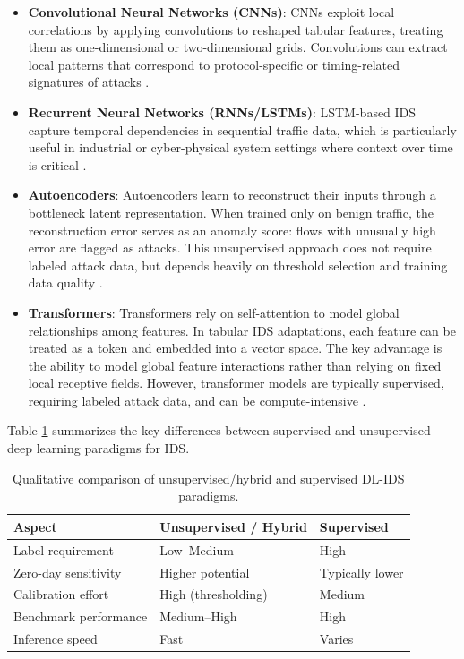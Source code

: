 \begin{itemize}
    \item \textbf{Convolutional Neural Networks (CNNs)}: CNNs exploit local correlations by applying convolutions to reshaped tabular features, treating them as one-dimensional or two-dimensional grids. Convolutions can extract local patterns that correspond to protocol-specific or timing-related signatures of attacks \cite{Vinayakumar2018}.
    \item \textbf{Recurrent Neural Networks (RNNs/LSTMs)}: LSTM-based IDS capture temporal dependencies in sequential traffic data, which is particularly useful in industrial or cyber-physical system settings where context over time is critical \cite{Kim2020}.
    \item \textbf{Autoencoders}: Autoencoders learn to reconstruct their inputs through a bottleneck latent representation. When trained only on benign traffic, the reconstruction error serves as an anomaly score: flows with unusually high error are flagged as attacks. This unsupervised approach does not require labeled attack data, but depends heavily on threshold selection and training data quality \cite{Li2020}.
    \item \textbf{Transformers}: Transformers rely on self-attention to model global relationships among features. In tabular IDS adaptations, each feature can be treated as a token and embedded into a vector space. The key advantage is the ability to model global feature interactions rather than relying on fixed local receptive fields. However, transformer models are typically supervised, requiring labeled attack data, and can be compute-intensive \cite{Peng2021}.
\end{itemize}

\par Table \ref{tab:paradigm_comparison} summarizes the key differences between supervised and unsupervised deep learning paradigms for IDS.

\begin{table}[htbp]
\begin{center}
\begin{tabular}{|p{100pt}|p{110pt}|p{110pt}|}
\hline
\textbf{Aspect} & \textbf{Unsupervised / Hybrid} & \textbf{Supervised} \\
\hline
\hline Label requirement & Low--Medium & High \\
\hline Zero-day sensitivity & Higher potential & Typically lower \\
\hline Calibration effort & High (thresholding) & Medium \\
\hline Benchmark performance & Medium--High & High \\
\hline Inference speed & Fast & Varies \\
\hline
\end{tabular}
\end{center}
\caption{Qualitative comparison of unsupervised/hybrid and supervised DL-IDS paradigms.}
\label{tab:paradigm_comparison}
\end{table}


